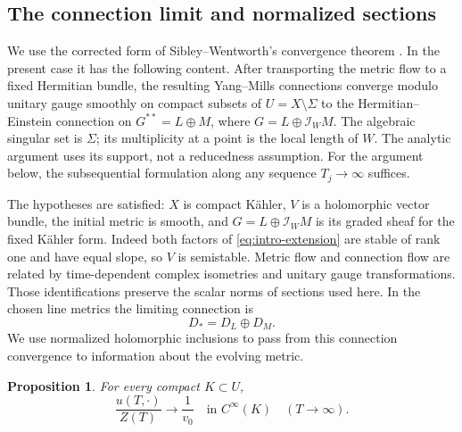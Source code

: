 \documentclass[11pt]{amsart}
\newtheorem{proposition}[theorem]{Proposition}
\theoremstyle{definition}
\theoremstyle{remark}
\newcommand{\cI}{\mathcal I}
\begin{document}
\subsection{The connection limit and normalized sections}
We use the corrected form of Sibley--Wentworth's convergence theorem
\cite[Theorem~1.1 and Remark~1.2]{sibleywentworth2015}. In the present
case it has the following content. After transporting the metric flow
to a fixed Hermitian bundle, the resulting Yang--Mills connections
converge modulo unitary gauge smoothly on compact subsets of
$U=X\setminus\Sigma$ to the Hermitian--Einstein connection on
$G^{**}=L\oplus M$, where $G=L\oplus\cI_WM$.
The algebraic singular set is $\Sigma$; its multiplicity at a point is
the local length of $W$. The analytic argument uses its support,
not a reducedness assumption. For the argument below, the subsequential formulation
along any sequence $T_j\to\infty$ suffices.

The hypotheses are satisfied: $X$ is compact K\"ahler, $V$ is a
holomorphic vector bundle, the initial metric is smooth, and
$G=L\oplus\cI_WM$ is its graded sheaf for the fixed K\"ahler form.
Indeed both factors of \eqref{eq:intro-extension} are stable of rank
one and have equal slope, so $V$ is semistable.
Metric flow and connection flow are related by time-dependent complex
isometries and unitary gauge transformations. Those identifications
preserve the scalar norms of sections used here. In the chosen line
metrics the limiting connection is
\begin{equation}\label{eq:limit-connection}
 D_*=D_L\oplus D_M.
\end{equation}
We use normalized holomorphic inclusions to pass from this connection
convergence to information about the evolving metric.

\begin{proposition}\label{prop:normalized-flow}
For every compact $K\subset U$,
\begin{equation}\label{eq:normalized-flow}
 \frac{u(T,\cdot)}{Z(T)}\longrightarrow\frac1{v_0}
 \quad\text{in }C^\infty(K)\quad(T\to\infty).
\end{equation}
\end{proposition}
\end{document}
